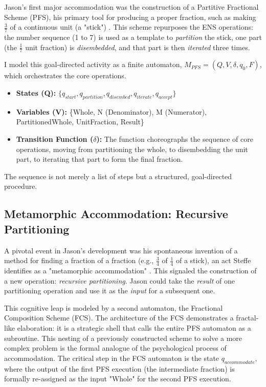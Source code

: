 \documentclass{article}
\begin{document}
Jason's first major accommodation was the construction of a Partitive Fractional Scheme (PFS), his primary tool for producing a proper fraction, such as making $\frac{3}{7}$ of a continuous unit (a "stick") \autocite{steffe2003construction}. This scheme repurposes the ENS operations: the number sequence (1 to 7) is used as a template to \textit{partition} the stick, one part (the $\frac{1}{7}$ unit fraction) is \textit{disembedded}, and that part is then \textit{iterated} three times.

I model this goal-directed activity as a finite automaton, $M_{PFS} = (Q, V, \delta, q_0, F)$, which orchestrates the core operations.

\begin{itemize}
    \item \textbf{States (Q):} $\{q_{start}, q_{partition}, q_{disembed}, q_{iterate}, q_{accept}\}$
    \item \textbf{Variables (V):} \{Whole, N (Denominator), M (Numerator), PartitionedWhole, UnitFraction, Result\}
    \item \textbf{Transition Function ($\delta$):} The function choreographs the sequence of core operations, moving from partitioning the whole, to disembedding the unit part, to iterating that part to form the final fraction.
\end{itemize}

The sequence is not merely a list of steps but a structured, goal-directed procedure.

\subsection{Metamorphic Accommodation: Recursive Partitioning}
A pivotal event in Jason's development was his spontaneous invention of a method for finding a fraction of a fraction (e.g., $\frac{3}{4}$ of $\frac{1}{4}$ of a stick), an act Steffe identifies as a "metamorphic accommodation" \autocite{steffe2003construction}. This signaled the construction of a new operation: \textit{recursive partitioning}. Jason could take the \textit{result} of one partitioning operation and use it as the \textit{input} for a subsequent one.

This cognitive leap is modeled by a second automaton, the Fractional Composition Scheme (FCS). The architecture of the FCS demonstrates a fractal-like elaboration: it is a strategic shell that calls the entire PFS automaton as a subroutine. This nesting of a previously constructed scheme to solve a more complex problem is the formal analogue of the psychological process of accommodation. The critical step in the FCS automaton is the state $q_{accommodate}$, where the output of the first PFS execution (the intermediate fraction) is formally re-assigned as the input "Whole" for the second PFS execution.
\end{document}
